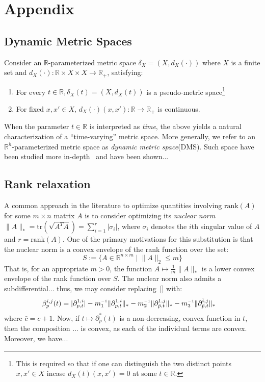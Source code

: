 \documentclass[10pt]{article}
\newcommand{\inv}{^{\raisebox{.2ex}{$\scriptscriptstyle-1$}}}
\begin{document}
\appendix
\section{Appendix}

\subsection*{Dynamic Metric Spaces}
Consider an $\mathbb{R}$-parameterized metric space $\delta_X = ( X, d_X(\cdot) )$ where
$X$ is a finite set and $d_X(\cdot): \mathbb{R} \times X \times X \to \mathbb{R}_{+}$, satisfying: 
\begin{enumerate}
	\item For every $t \in \mathbb{R}, \delta_X(t) = (X, d_X(t))$ is a pseudo-metric space\footnote{This is required so that if one can distinguish the two distinct points $x, x' \in X$ incase $d_X(t)(x, x') = 0$ at some $t \in \mathbb{R}$. } 
	\item For fixed $x, x' \in X$, $d_X(\cdot)(x, x'): \mathbb{R} \to \mathbb{R}_{+}$ is continuous.
\end{enumerate}
When the parameter $t \in \mathbb{R}$ is interpreted as \emph{time}, the above yields a natural characterization of a ``time-varying'' metric space. More generally, we refer to an $\mathbb{R}^h$-parameterized metric space as \emph{dynamic metric space}(DMS). Such space have been studied more in-depth~\cite{} and have been shown...
 

\subsection*{Rank relaxation}
A common approach in the literature to optimize quantities involving $\mathrm{rank}(A)$ for some $m \times n$ matrix $A$ is to consider optimizing its \emph{nuclear norm} $\lVert A \rVert_\ast = \mathrm{tr}(\sqrt{A^T A}) = \sum_{i=1}^r \lvert \sigma_i \rvert$, where $\sigma_i$ denotes the $i$th singular value of $A$ and $r=\mathrm{rank}(A)$. One of the primary motivations for this substitution is that the nuclear norm is a convex envelope of the rank function over the set: 
$$
S := \{ A \in \mathbb{R}^{n \times m} \mid \lVert A \rVert_2 \leq m \}
$$
That is, for an appropriate $m > 0$, the function $A \mapsto \frac{1}{m}\lVert A \rVert_\ast$ is a lower convex envelope of the rank function over $S$. The nuclear norm also admits a subdifferential... thus, we may consider replacing~\eqref{} with: 
\begin{align}\label{eq:betti_four_nuc}
	\beta_p^{i,j}(t) &= \lvert \partial_{p,t}^{1,i} \rvert -
	m_1\inv \lVert \partial_{p,t}^{1,i} \rVert_\ast - 
	m_2\inv \lVert \partial_{\bar{p},t}^{1,j}\rVert_\ast - 
	m_3\inv \lVert\partial_{\bar{p},t}^{\bar{i},j}\rVert_\ast 
\end{align}
where $\bar{c} = c + 1$. Now, if $t \mapsto \partial_p^\ast(t)$ is a non-decreasing, convex function in $t$, then the composition ... is convex, as each of the individual terms are convex. Moreover, we have...
\end{document}
